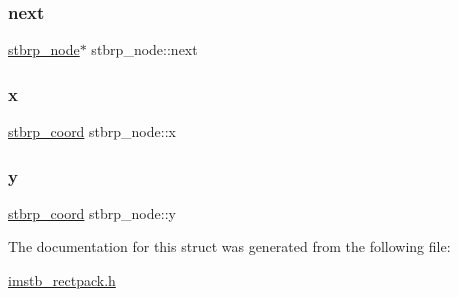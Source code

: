 \subsubsection{\texorpdfstring{next}{next}}
{\footnotesize\ttfamily \mbox{\hyperlink{structstbrp__node}{stbrp\+\_\+node}}$\ast$ stbrp\+\_\+node\+::next}

\mbox{\label{structstbrp__node_a45ab31a88025db27d08040d715b129ea}} 
\subsubsection{\texorpdfstring{x}{x}}
{\footnotesize\ttfamily \mbox{\hyperlink{imstb__rectpack_8h_ac2c2491b95dea6a298b7423dc762dfd9}{stbrp\+\_\+coord}} stbrp\+\_\+node\+::x}

\mbox{\label{structstbrp__node_ad0415cb102a4f37aa45073653307e67e}} 
\subsubsection{\texorpdfstring{y}{y}}
{\footnotesize\ttfamily \mbox{\hyperlink{imstb__rectpack_8h_ac2c2491b95dea6a298b7423dc762dfd9}{stbrp\+\_\+coord}} stbrp\+\_\+node\+::y}



The documentation for this struct was generated from the following file\+:\begin{DoxyCompactItemize}
\item 
\mbox{\hyperlink{imstb__rectpack_8h}{imstb\+\_\+rectpack.\+h}}\end{DoxyCompactItemize}
